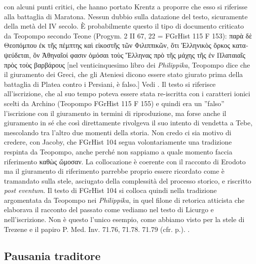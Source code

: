 {con alcuni punti critici, che hanno portato Krentz a proporre che esso si riferisse alla battaglia di Maratona. Nessun dubbio sulla datazione del testo, sicuramente della metà del IV secolo. È probabilmente questo il tipo di documento criticato da Teopompo  secondo Teone (Progym. 2 II 67, 22 = FGrHist 115 F 153): \textgreek{παρὰ δὲ Θεοπόμπου ἐκ τῆς πέμπτης καὶ εἰκοστῆς τῶν Φιλιππικῶν, ὅτι  Ἑλληνικὸς ὅρκος καταψεύδεται, ὃν Ἀθηναῖοί φασιν ὀμόσαι τοὺς Ἕλληνας πρὸ τῆς μάχης τῆς ἐν Πλαταιαῖς πρὸς τοὺς βαρβάρους} [nel venticinquesimo libro dei \emph{Philippika}, Teopompo dice che il giuramento dei Greci, che gli Ateniesi dicono essere stato giurato prima della battaglia di Platea contro i Persiani, è falso.] Vedi \cite[9, 80 e n.25]{Shrimpton1991}. Il testo si riferisce all'iscrizione, che al suo tempo poteva essere stata re-iscritta con i caratteri ionici scelti da Archino (Teopompo FGrHist 115 F 155) e quindi era un ''falso'' l'iscrizione con il giuramento in termini di riproduzione, ma forse anche il giuramento in sé che così direttamente rivolgeva il suo intento di vendetta a Tebe, mescolando tra l'altro due momenti della storia. Non credo ci sia motivo di credere, con Jacoby, che FGrHist 104 segua volontariamente una tradizione respinta da Teopompo, anche perché non sappiamo a quale momento faccia riferimento \textgreek{ καθὼς ὤμοσαν}. La collocazione è coerente con il racconto di Erodoto ma il giuramento di riferimento parrebbe proprio essere ricordato come è tramandato sulla stele, asciugato della complessità del processo storico, e riscritto \emph{post eventum}. Il testo di FGrHist 104 si colloca quindi nella tradizione argomentata da Teopompo  nei \emph{Philippika}, in quel filone di retorica atticista che elaborava il racconto del passato come vediamo nel testo di Licurgo  e nell'iscrizione. Non è questo l'unico esempio, come abbiamo visto per la stele di Trezene e il papiro P. Med. Inv. 71.76, 71.78. 71.79 (cfr. p.\pageref{ref:decretoditemistocle}). \cite{Siewert1972}.
        \subsection*{Pausania traditore}
}

